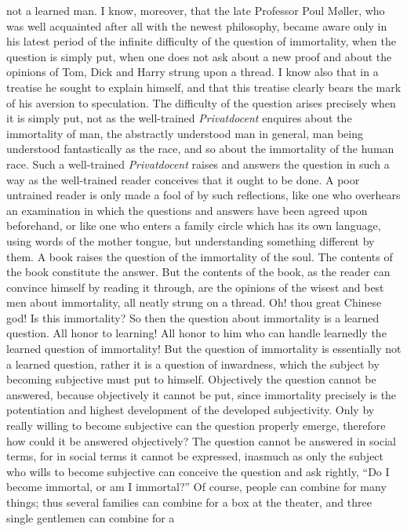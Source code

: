 \documentclass[12pt]{article}
\begin{document}
not a learned man. I know, moreover, that the late Professor Poul
M\o{}ller, who was well acquainted after all with the newest philosophy,
became aware only in his latest period of the infinite difficulty of
the question of immortality, when the question is simply put, when one
does not ask about a new proof and about the opinions of Tom, Dick and
Harry strung upon a thread. I know also that in a treatise he sought
to explain himself, and that this treatise clearly bears the mark of
his aversion to speculation. The difficulty of the question arises
precisely when it is simply put, not as the well-trained
\textit{Privatdocent} enquires about the immortality of man, the
abstractly understood man in general, man being understood fantastically
as the race, and so about the immortality of the human race. Such a
well-trained \textit{Privatdocent} raises and answers the question in
such a way as the well-trained reader conceives that it ought to be
done. A poor untrained reader is only made a fool of by such
reflections, like one who overhears an examination in which the
questions and answers have been agreed upon beforehand, or like one who
enters a family circle which has its own language, using words of the
mother tongue, but understanding something different by them. A book
raises the question of the immortality of the soul. The contents of the
book constitute the answer. But the contents of the book, as the reader
can convince himself by reading it through, are the opinions of the
wisest and best men about immortality, all neatly strung on a thread.
Oh! thou great Chinese god! Is this immortality? So then the question
about immortality is a learned question. All honor to learning! All
honor to him who can handle learnedly the learned question of
immortality! But the question of immortality is essentially not a
learned question, rather it is a question of inwardness, which the
subject by becoming subjective must put to himself. Objectively the
question cannot be answered, because objectively it cannot be put,
since immortality precisely is the potentiation and highest development
of the developed subjectivity. Only by really willing to become
subjective can the question properly emerge, therefore how could it be
answered objectively? The question cannot be answered in social terms,
for in social terms it cannot be expressed, inasmuch as only the
subject who wills to become subjective can conceive the question and
ask rightly, ``Do I become immortal, or am I immortal?'' Of course,
people can combine for many things; thus several families can combine
for a box at the theater, and three single gentlemen can combine for a
\end{document}
